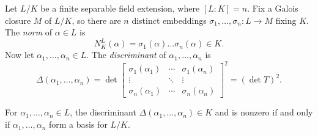 \begin{definition}
  Let $L / K$ be a finite separable field extension,
  where $[L : K] = n$.
  Fix a Galois closure $M$ of $L / K$, so there are
  $n$ distinct embeddings
  $\sigma_1, \dots, \sigma_n : L \to M$ fixing $K$. The
  \emph{norm} of $\alpha \in L$ is
  \[
    N^L_{K}(\alpha) = \sigma_1(\alpha) \dots \sigma_n(\alpha) \in K.
  \]
  Now let $\alpha_1, \dots, \alpha_n \in L$.
  The \emph{discriminant} of $\alpha_1, \dots, \alpha_n$
  is
  \[
    \Delta(\alpha_1, \dots, \alpha_n) = \det
    \begin{bmatrix}
      \sigma_1(\alpha_1) & \cdots & \sigma_1(\alpha_n) \\
      \vdots & \ddots & \vdots \\
      \sigma_n(\alpha_1) & \cdots & \sigma_n(\alpha_n)
    \end{bmatrix}^2 = (\det T)^2.
  \]
\end{definition}

\begin{lemma}
  For $\alpha_1, \dots, \alpha_n \in L$,
  the discriminant
  $\Delta(\alpha_1, \dots, \alpha_n) \in K$
  and is nonzero if and
  only if $\alpha_1, \dots, \alpha_n$ form a basis
  for $L / K$.
\end{lemma}

